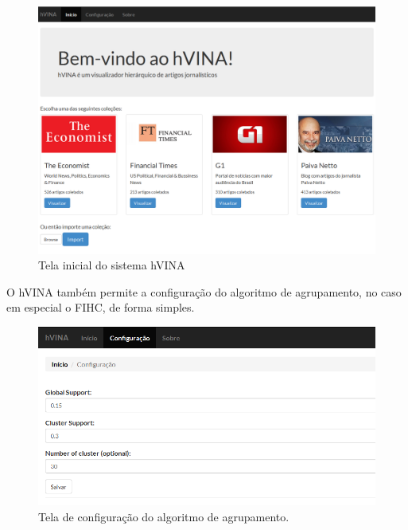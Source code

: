 \documentclass[a4paper,12pt]{article}
\begin{document}
\begin{figure}[H]
    \begin{center}
        \includegraphics[scale=0.3]{hvina_inicial.png}
    \end{center}
    \caption{Tela inicial do sistema hVINA}
    \label{fig:hvina_inicial}
\end{figure}

O hVINA também permite a configuração do algoritmo de agrupamento, no caso em especial o FIHC, de forma simples.

\begin{figure}[H]
    \begin{center}
        \includegraphics[scale=0.45]{hvina_configuracao.png}
    \end{center}
    \caption{Tela de configuração do algoritmo de agrupamento.}
    \label{fig:hvina_configuracao}
\end{figure}
\end{document}
